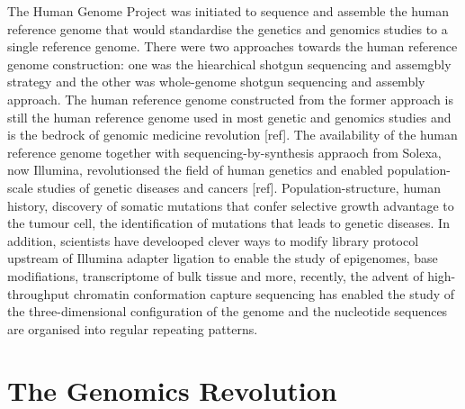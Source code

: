 The Human Genome Project was initiated to sequence and assemble the human reference genome that would standardise the genetics and genomics studies to a single reference genome. There were two approaches towards the human reference genome construction: one was the hiearchical shotgun sequencing and assemgbly strategy and the other was whole-genome shotgun sequencing and assembly approach. The human reference genome constructed from the former approach is still the human reference genome used in most genetic and genomics studies and is the bedrock of genomic medicine revolution [ref]. The availability of the human reference genome together with sequencing-by-synthesis appraoch from Solexa, now Illumina, revolutionsed the field of human genetics and enabled population-scale studies of genetic diseases and cancers [ref]. Population-structure, human history, discovery of somatic mutations that confer selective growth advantage to the tumour cell, the identification of mutations that leads to genetic diseases. In addition, scientists have develooped clever ways to modify library protocol upstream of Illumina adapter ligation to enable the study of epigenomes, base modifiations, transcriptome of bulk tissue and more, recently, the advent of high-throughput chromatin conformation capture sequencing has enabled the study of the three-dimensional configuration of the genome and the nucleotide sequences are organised into regular repeating patterns. 

\section{The Genomics Revolution}


